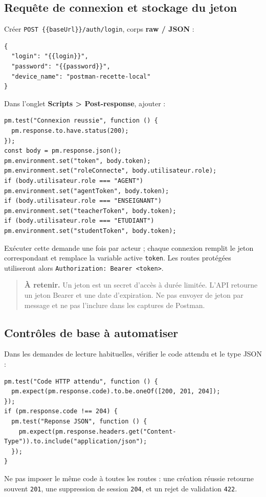 \documentclass[10pt,a4paper]{article}
\newcommand{\method}[1]{\texttt{\small #1}}
\newcommand{\note}[1]{\begin{quote}\colorbox{gnuPale}{\parbox{0.94\linewidth}{\textbf{À retenir. }#1}}\end{quote}}
\begin{document}
\subsection{Requête de connexion et stockage du jeton}

Créer \method{POST \{\{baseUrl\}\}/auth/login}, corps \textbf{raw / JSON} :
\begin{lstlisting}
{
  "login": "{{login}}",
  "password": "{{password}}",
  "device_name": "postman-recette-local"
}
\end{lstlisting}

Dans l’onglet \textbf{Scripts > Post-response}, ajouter :
\begin{lstlisting}
pm.test("Connexion reussie", function () {
  pm.response.to.have.status(200);
});
const body = pm.response.json();
pm.environment.set("token", body.token);
pm.environment.set("roleConnecte", body.utilisateur.role);
if (body.utilisateur.role === "AGENT") pm.environment.set("agentToken", body.token);
if (body.utilisateur.role === "ENSEIGNANT") pm.environment.set("teacherToken", body.token);
if (body.utilisateur.role === "ETUDIANT") pm.environment.set("studentToken", body.token);
\end{lstlisting}

Exécuter cette demande une fois par acteur ; chaque connexion remplit le jeton correspondant et remplace la variable active \texttt{token}. Les routes protégées utiliseront alors \texttt{Authorization: Bearer <token>}.

\note{Un jeton est un secret d’accès à durée limitée. L’API retourne un jeton Bearer et une date d’expiration. Ne pas envoyer de jeton par message et ne pas l’inclure dans les captures de Postman.}

\subsection{Contrôles de base à automatiser}

Dans les demandes de lecture habituelles, vérifier le code attendu et le type JSON :
\begin{lstlisting}
pm.test("Code HTTP attendu", function () {
  pm.expect(pm.response.code).to.be.oneOf([200, 201, 204]);
});
if (pm.response.code !== 204) {
  pm.test("Reponse JSON", function () {
    pm.expect(pm.response.headers.get("Content-Type")).to.include("application/json");
  });
}
\end{lstlisting}

Ne pas imposer le même code à toutes les routes : une création réussie retourne souvent \texttt{201}, une suppression de session \texttt{204}, et un rejet de validation \texttt{422}.
\end{document}
